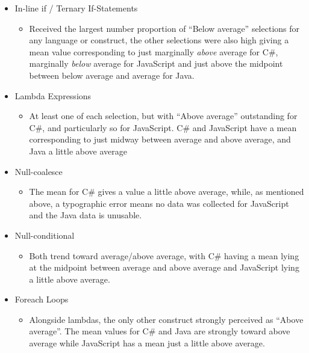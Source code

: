 \documentclass{article}
\begin{document}
            \begin{itemize}
                \item In-line if / Ternary If-Statements
                \begin{itemize}
                    \item Received the largest number proportion of ``Below average'' selections for any language or construct, the other selections were also high giving a mean value corresponding to just marginally \emph{above} average for C\#, marginally \emph{below} average for JavaScript and just above the midpoint between below average and average for Java.
                \end{itemize}
                \item Lambda Expressions
                \begin{itemize}
                    \item At least one of each selection, but with ``Above average'' outstanding for C\#, and particularly so for JavaScript. C\# and JavaScript have a mean corresponding to just midway between average and above average, and Java a little above average
                \end{itemize}
                \item Null-coalesce
                \begin{itemize}
                    \item The mean for C\# gives a value a little above average, while, as mentioned above, a typographic error means no data was collected for JavaScript and the Java data is unusable.
                \end{itemize}
                \item Null-conditional
                \begin{itemize}
                    \item Both trend toward average/above average, with C\# having a mean lying at the midpoint between average and above average and JavaScript lying a little above average.
                \end{itemize}
                \item Foreach Loops
                \begin{itemize}
                    \item Alongside lambdas, the only other construct strongly perceived as ``Above average''. The mean values for C\# and Java are strongly toward above average while JavaScript has a mean just a little above average.
                \end{itemize}

\end{itemize}
\end{document}
